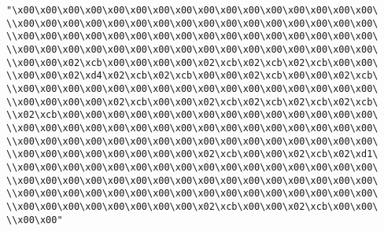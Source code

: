 \verb|"\x00\x00\x00\x00\x00\x00\x00\x00\x00\x00\x00\x00\x00\x00\x00\x00\|\newline
\verb|\\x00\x00\x00\x00\x00\x00\x00\x00\x00\x00\x00\x00\x00\x00\x00\x00\|\newline
\verb|\\x00\x00\x00\x00\x00\x00\x00\x00\x00\x00\x00\x00\x00\x00\x00\x00\|\newline
\verb|\\x00\x00\x00\x00\x00\x00\x00\x00\x00\x00\x00\x00\x00\x00\x00\x00\|\newline
\verb|\\x00\x00\x02\xcb\x00\x00\x00\x00\x02\xcb\x02\xcb\x02\xcb\x00\x00\|\newline
\verb|\\x00\x00\x02\xd4\x02\xcb\x02\xcb\x00\x00\x02\xcb\x00\x00\x02\xcb\|\newline
\verb|\\x00\x00\x00\x00\x00\x00\x00\x00\x00\x00\x00\x00\x00\x00\x00\x00\|\newline
\verb|\\x00\x00\x00\x00\x02\xcb\x00\x00\x02\xcb\x02\xcb\x02\xcb\x02\xcb\|\newline
\verb|\\x02\xcb\x00\x00\x00\x00\x00\x00\x00\x00\x00\x00\x00\x00\x00\x00\|\newline
\verb|\\x00\x00\x00\x00\x00\x00\x00\x00\x00\x00\x00\x00\x00\x00\x00\x00\|\newline
\verb|\\x00\x00\x00\x00\x00\x00\x00\x00\x00\x00\x00\x00\x00\x00\x00\x00\|\newline
\verb|\\x00\x00\x00\x00\x00\x00\x00\x00\x02\xcb\x00\x00\x02\xcb\x02\xd1\|\newline
\verb|\\x00\x00\x00\x00\x00\x00\x00\x00\x00\x00\x00\x00\x00\x00\x00\x00\|\newline
\verb|\\x00\x00\x00\x00\x00\x00\x00\x00\x00\x00\x00\x00\x00\x00\x00\x00\|\newline
\verb|\\x00\x00\x00\x00\x00\x00\x00\x00\x00\x00\x00\x00\x00\x00\x00\x00\|\newline
\verb|\\x00\x00\x00\x00\x00\x00\x00\x00\x02\xcb\x00\x00\x02\xcb\x00\x00\|\newline
\verb|\\x00\x00"|\newline
